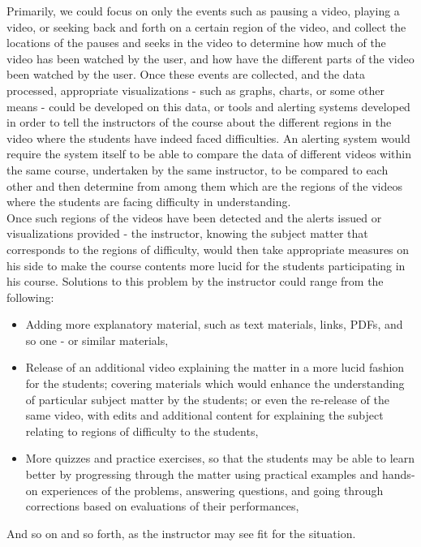 \documentclass[16pt]{report}
\begin{document}
Primarily, we could focus on only the events such as pausing a video, playing a video, or seeking back and forth on a certain region of the video, and collect the locations of the pauses and seeks in the video to determine how much of the video has been watched by the user, and how have the different parts of the video been watched by the user. Once these events are collected, and the data processed, appropriate visualizations - such as graphs, charts, or some other means - could be developed on this data, or tools and alerting systems developed in order to tell the instructors of the course about the different regions in the video where the students have indeed faced difficulties. An alerting system would require the system itself to be able to compare the data of different videos within the same course, undertaken by the same instructor, to be compared to each other and then determine from among them which are the regions of the videos where the students are facing difficulty in understanding.\\

Once such regions of the videos have been detected and the alerts issued or visualizations provided - the instructor, knowing the subject matter that corresponds to the regions of difficulty, would then take appropriate measures on his side to make the course contents more lucid for the students participating in his course. Solutions to this problem by the instructor could range from the following:

\begin{itemize}
\item Adding more explanatory material, such as text materials, links, PDFs, and so one - or similar materials,
\item Release of an additional video explaining the matter in a more lucid fashion for the students; covering materials which would enhance the understanding of particular subject matter by the students; or even the re-release of the same video, with edits and additional content for explaining the subject relating to regions of difficulty to the students,
\item More quizzes and practice exercises, so that the students may be able to learn better by progressing through the matter using practical examples and hands-on experiences of the problems, answering questions, and going through corrections based on evaluations of their performances,
\end{itemize}

And so on and so forth, as the instructor may see fit for the situation.\\
\end{document}
